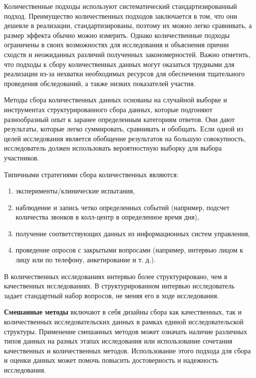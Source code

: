 \documentclass[12pt,a4paper, oneside]{extreport}
\begin{document}
 Количественные подходы используют систематический стандартизированный подход. Преимущество количественных подходов заключается в том, что они дешевле в реализации, стандартизированы, поэтому их можно легко сравнивать, а размер эффекта обычно можно измерить. Однако количественные подходы ограничены в своих возможностях для исследования и объяснения причин сходств и неожиданных различий полученных закономерностей. Важно отметить, что подходы к сбору количественных данных могут оказаться  трудными для реализации из-за нехватки необходимых ресурсов для обеспечения тщательного проведения обследований, а также низких показателей  участия. 
 
 Методы сбора количественных данных основаны на случайной выборке и инструментах структурированного сбора данных, которые подгоняют разнообразный опыт к заранее определенным категориям ответов. Они дают результаты, которые легко суммировать, сравнивать и обобщать. Если одной из целей исследования является  обобщение результатов  на большую совокупность, исследователь должен использовать вероятностную выборку для выбора участников. 
 
 Типичными  стратегиями  сбора количественных являются:
 
 \begin{enumerate}
 	\item эксперименты/клинические испытания,
 	\item наблюдение и запись четко определенных событий (например, подсчет количества звонков в колл-центр в определенное время дня),
 	\item получение соответствующих данных из информационных систем управления,
 	\item проведение опросов с закрытыми вопросами (например, интервью лицом к лицу или по телефону, анкетирование и т. д.).
 \end{enumerate}

В количественных исследованиях интервью более структурировано, чем в качественных исследованиях. В структурированном интервью исследователь задает стандартный набор вопросов, не меняя его в ходе исследования. 

\textbf{Смешанные методы} включают в себя дизайны сбора  как качественных, так и количественных исследовательских данных  в рамках единой исследовательской структуры. Применение  смешанных методов может  означать наличие различных типов данных на разных этапах исследования или использование сочетания качественных и количественных методов. 
Использование этого подхода для сбора и оценки данных может помочь повысить достоверность и надежность исследования. 
\end{document}

